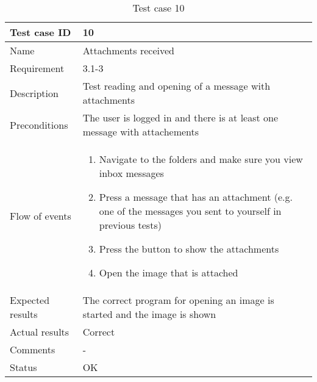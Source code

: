 		\begin{table}
			\begin{tabular}{l|p{10cm}}
				Test case ID & 10 \\ \hline
				Name & Attachments received\\ \hline
				Requirement & 3.1-3\\ \hline
				Description & Test reading and opening of a message with attachments\\ \hline
				Preconditions & The user is logged in and there is at least one message with attachements\\ \hline
				Flow of events & 
					\begin{enumerate}
						\item{}Navigate to the folders and make sure you view inbox messages
						\item{}Press a message that has an attachment (e.g. one of the messages you sent to yourself in previous tests)
						\item{}Press the button to show the attachments
						\item{}Open the image that is attached
					\end{enumerate} \\ \hline
				Expected results & The correct program for opening an image is started and the image is shown \\ \hline
				Actual results &Correct\\ \hline
				Comments &-\\ \hline
				Status &OK \\ \hline
			\end{tabular}
			\caption{Test case 10} \label{tab:case10}
		\end{table}

